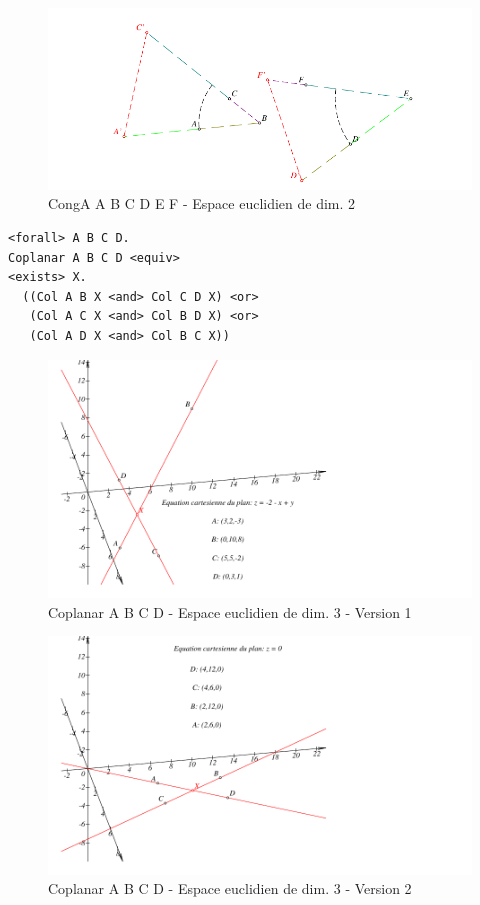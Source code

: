 \documentclass[8pt,a4paper]{article}
\theoremstyle{plain}
\begin{document}
    \begin{figure}[H] %
  \centering
    \includegraphics[width=150mm]{fig09.pdf}
\caption{CongA A B C D E F - Espace euclidien de dim. 2\label{CongA1}}
\end{figure}


\begin{tcolorbox}
\begin{verbatim}
<forall> A B C D.
Coplanar A B C D <equiv>
<exists> X. 
  ((Col A B X <and> Col C D X) <or>
   (Col A C X <and> Col B D X) <or>
   (Col A D X <and> Col B C X))
\end{verbatim}
\end{tcolorbox}

  \begin{figure}[H] %
  \centering
    \includegraphics[width=150mm]{fig05.pdf}
\caption{Coplanar A B C D - Espace euclidien de dim. 3 - Version 1\label{Coplanar1}}
\end{figure}

    \begin{figure}[H] %
  \centering
    \includegraphics[width=150mm]{fig06.pdf}
\caption{Coplanar A B C D - Espace euclidien de dim. 3 - Version 2\label{Coplanar2}}
\end{figure}
\end{document}
